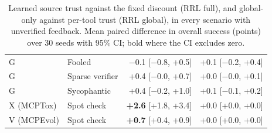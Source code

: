 \begin{table}[H]
\begin{tabular}{llrr}
G & Fooled & $-$0.1 [$-$0.8, +0.5] & +0.1 [$-$0.2, +0.4] \\
G & Sparse verifier & +0.4 [$-$0.0, +0.7] & +0.0 [$-$0.0, +0.1] \\
G & Sycophantic & +0.4 [$-$0.2, +1.0] & +0.1 [$-$0.1, +0.2] \\
X (MCPTox) & Spot check & \textbf{+2.6} [+1.8, +3.4] & +0.0 [+0.0, +0.0] \\
V (MCPEvol) & Spot check & \textbf{+0.7} [+0.4, +0.9] & +0.0 [+0.0, +0.0] \\
\bottomrule
\end{tabular}
\caption{Learned source trust against the fixed discount (RRL full), and global-only against per-tool trust (RRL global), in every scenario with unverified feedback. Mean paired difference in overall success (points) over 30 seeds with 95\% CI; bold where the CI excludes zero.}
\label{tab:trust}
\end{table}
